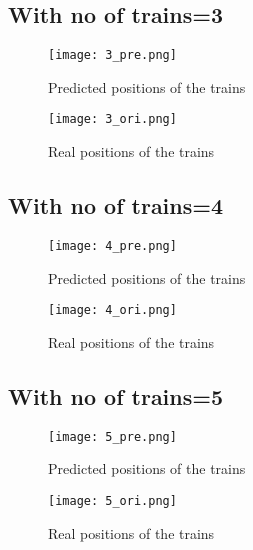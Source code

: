 \subsection{With no of trains=3 }
\begin{figure}[h!]
\begin{minipage}{.5\textwidth}

\centering
\texttt{[image: 3\_pre.png]}
\caption{Predicted positions of the trains}

\end{minipage}%
\begin{minipage}{.5\textwidth}


\centering
\texttt{[image: 3\_ori.png]}
\caption{Real positions of the trains}

\end{minipage}%
\end{figure}
\subsection{With no of trains=4 }
\begin{figure}[h!]
\begin{minipage}{.5\textwidth}


\centering
\texttt{[image: 4\_pre.png]}
\caption{Predicted positions of the trains}

\end{minipage}%
\begin{minipage}{.5\textwidth}

\centering
\texttt{[image: 4\_ori.png]}
\caption{Real positions of the trains}

\end{minipage}%
\end{figure}
\newpage
\subsection{With no of trains=5 }
\begin{figure}[h!]
\begin{minipage}{.5\textwidth}

\centering
\texttt{[image: 5\_pre.png]}
\caption{Predicted positions of the trains}

\end{minipage}%
\begin{minipage}{.5\textwidth}

\label{No of trains=1}
\centering
\texttt{[image: 5\_ori.png]}
\caption{Real positions of the trains}

\end{minipage}%
\end{figure}


